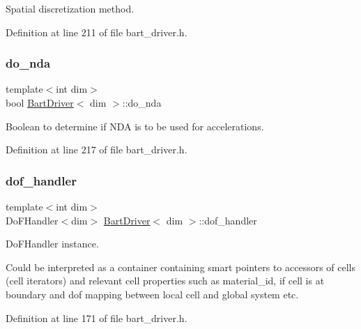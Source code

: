 Spatial discretization method. 



Definition at line 211 of file bart\+\_\+driver.\+h.

\mbox{\label{class_bart_driver_acb7aa4c65a18deef5e1be7a3477d1b12}} 
\subsubsection{\texorpdfstring{do\+\_\+nda}{do\_nda}}
{\footnotesize\ttfamily template$<$int dim$>$ \\
bool \hyperlink{class_bart_driver}{Bart\+Driver}$<$ dim $>$\+::do\+\_\+nda\hspace{0.3cm}{\ttfamily [private]}}



Boolean to determine if N\+DA is to be used for accelerations. 



Definition at line 217 of file bart\+\_\+driver.\+h.

\mbox{\label{class_bart_driver_a102ccb2fc2ea225bc75f757214152c1b}} 
\subsubsection{\texorpdfstring{dof\+\_\+handler}{dof\_handler}}
{\footnotesize\ttfamily template$<$int dim$>$ \\
Do\+F\+Handler$<$dim$>$ \hyperlink{class_bart_driver}{Bart\+Driver}$<$ dim $>$\+::dof\+\_\+handler\hspace{0.3cm}{\ttfamily [private]}}



Do\+F\+Handler instance. 

Could be interpreted as a container containing smart pointers to accessors of cells (cell iterators) and relevant cell properties such as material\+\_\+id, if cell is at boundary and dof mapping between local cell and global system etc. 

Definition at line 171 of file bart\+\_\+driver.\+h.

\mbox{\label{class_bart_driver_a90adc0f013f07a10c5d423e3506bd589}} 
